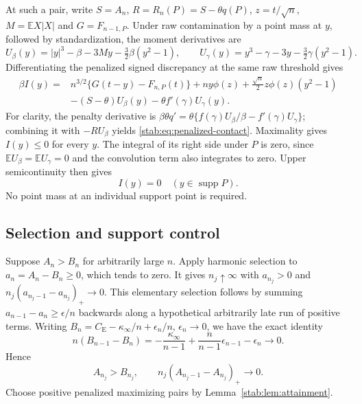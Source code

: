 \documentclass[11pt,a4paper]{article}
\numberwithin{equation}{section}
\theoremstyle{definition}
\theoremstyle{remark}
\newcommand{\E}{\mathbb E}
\newcommand{\CE}{C_{\mathrm E}}
\DeclareMathOperator{\supp}{supp}
\begin{document}
At such a pair, write $S=A_n$, $R=R_n(P)=S-\theta q(P)$,
$z=t/\sqrt n$, $M=\E X|X|$ and $G=F_{n-1,P}$. Under raw
contamination by a point mass at $y$, followed by standardization,
the moment derivatives are
\[
 U_\beta(y)=|y|^3-\beta-3My-\tfrac32\beta(y^2-1),\qquad
 U_\gamma(y)=y^3-\gamma-3y-\tfrac32\gamma(y^2-1).
\]
Differentiating the penalized signed discrepancy at the same raw
threshold gives
\begin{equation}\label{stab:eq:penalized-contact}
 \begin{split}
 \beta I(y)={}&n^{3/2}\{G(t-y)-F_{n,P}(t)\}
       +ny\phi(z)+\tfrac{\sqrt n}{2}z\phi(z)(y^2-1)\\
       &-(S-\theta)U_\beta(y)-\theta f'(\gamma)U_\gamma(y).
 \end{split}
\end{equation}
For clarity, the penalty derivative is
$\beta\theta q'=\theta\{f(\gamma)U_\beta/\beta-f'(\gamma)U_\gamma\}$;
combining it with $-R U_\beta$ yields \eqref{stab:eq:penalized-contact}.
Maximality gives $I(y)\le0$ for every $y$. The integral of its right
side under $P$ is zero, since $\E U_\beta=\E U_\gamma=0$ and the
convolution term also integrates to zero. Upper semicontinuity then
gives
\begin{equation}\label{stab:eq:whole-contact}
                            I(y)=0\quad(y\in\supp P).
\end{equation}
No point mass at an individual support point is required.

\subsection{Selection and support control}

Suppose $A_n>B_n$ for arbitrarily large $n$. Apply harmonic
selection to $a_n=A_n-B_n\ge0$, which tends to zero. It gives
$n_j\uparrow\infty$ with $a_{n_j}>0$ and
$n_j(a_{n_j-1}-a_{n_j})_+\to0$. This elementary selection follows
by summing $a_{n-1}-a_n\ge\epsilon/n$ backwards along a hypothetical
arbitrarily late run of positive terms.
Writing $B_n=\CE-\kappa_\infty/n+\epsilon_n/n$, $\epsilon_n\to0$,
we have the exact identity
\[
 n(B_{n-1}-B_n)=-\frac{\kappa_\infty}{n-1}
                +\frac n{n-1}\epsilon_{n-1}-\epsilon_n\to0.
\]
Hence
\begin{equation}\label{stab:eq:selected}
 A_{n_j}>B_{n_j},\qquad
                  n_j(A_{n_j-1}-A_{n_j})_+\longrightarrow0.
\end{equation}
Choose positive penalized maximizing pairs by
Lemma~\ref{stab:lem:attainment}.
\end{document}
